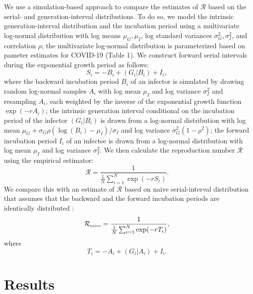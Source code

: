 \documentclass[12pt]{article}
\begin{document}
We use a simulation-based approach to compare the estimates of $\mathcal R$ based on the serial- and generation-interval distributions. 
To do so, we model the intrinsic generation-interval distribution and the incubation period using a multivariate log-normal distribution with log means $\mu_G, \mu_I$, log standard variances $\sigma_G^2, \sigma_I^2$, and correlation $\rho$;
the multivariate log-normal distribution is parameterized based on pameter estimates for COVID-19 (Table 1).
We construct forward serial intervals during the exponential growth period as follows:
\begin{equation}
S_i = -B_i + (G_i|B_i) + I_i,
\end{equation}
where the backward incubation period $B_i$ of an infector is simulated by drawing random log-normal samples $A_i$ with log mean $\mu_I$ and log variance $\sigma_I^2$ and resampling $A_i$, each weighted by the inverse of the exponential growth function $\exp(-rA_i)$;
the intrinsic generation interval conditional on the incubation period of the infector $(G_i|B_i)$ is drawn from a log-normal distribution with log mean $\mu_G + \sigma_G \rho (\log(B_i) - \mu_I)/\sigma_I$ and log variance $\sigma_G^2 (1-\rho^2)$;
the forward incubation period $I_i$ of an infectee is drawn from a log-normal distribution with log mean $\mu_I$ and log variance $\sigma_I^2$.
We then calculate the reproduction number $\mathcal R$ using the empirical estimator:
\begin{equation}
\mathcal R = \frac{1}{\frac{1}{N}\sum_{i=1}^N \exp(- r S_i)}.
\end{equation}
We compare this with an estimate of $\mathcal R$ based on naive serial-interval distribution that assumes that the backward and the forward incubation periods are identically distributed \citep{svensson2007note,klinkenberg2011correlation,champredon2018equivalence, britton2019estimation}:
\begin{equation}
{\mathcal R}_{\textrm{\tiny naive}} = \frac{1}{\frac{1}{N}\sum_{i=1}^N \exp(- r T_i)},
\end{equation}
where
\begin{equation}
T_i = -A_i + (G_i|A_i) + I_i.
\end{equation}

\section{Results}
\end{document}
